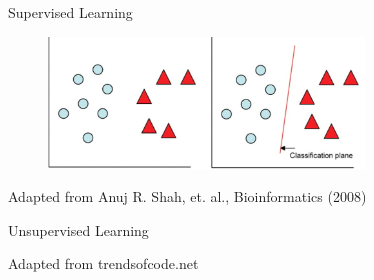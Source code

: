 \documentclass[utf8, a4paper]{beamer}
\begin{document}
\begin{frame} {Supervised Learning} 

\vspace{-0.9cm}

\begin{figure}
\centering
  \includegraphics[trim={0cm 0cm 0cm 0cm},clip, width=0.75\textwidth]{images/supervised}
\end{figure}


\tiny{Adapted from Anuj R. Shah, et. al.,  Bioinformatics (2008) }

\end{frame}
\begin{frame} {Unsupervised Learning} 

\vspace{-0.9cm}

\begin{center}


 
\end{center}



\tiny{Adapted from trendsofcode.net }

\end{frame}
\end{document}
